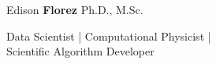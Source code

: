 \begin{center}
    {\fontsize{50}{40}\selectfont Edison \textbf{Florez}}
    \hspace*{5mm}
    {\fontsize{20}{40}\selectfont Ph.D., M.Sc.}

    \vspace*{3mm}
    \Large{
        Data Scientist | Computational Physicist | \\
        Scientific Algorithm Developer
    }
\end{center}
